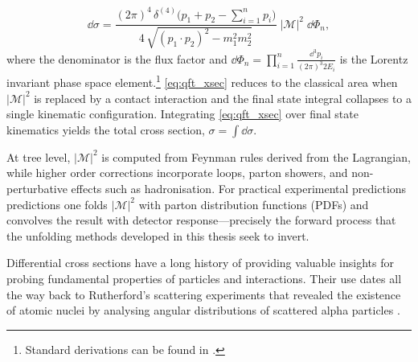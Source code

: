 \begin{definition}
    \begin{equation}
      \dd\sigma =
      \frac{(2\pi)^4 \, \delta^{(4)}\!\bigl(p_1 + p_2 - \sum_{i=1}^n p_i\bigr)}
           {4\,\sqrt{(p_1\!\cdot\!p_2)^2 - m_1^2 m_2^2}}
      \; |\mathcal{M}|^2 \;
      \dd\Phi_n,
      \label{eq:qft_xsec}
    \end{equation}
    where the denominator is the flux factor and \(\dd\Phi_n = \prod_{i=1}^{n} \tfrac{\dd^3 p_i}{(2\pi)^3 2E_i}\) is the Lorentz invariant phase space element.\footnote{Standard derivations can be found in \cite{peskin_introduction_1995,Navas2024ReviewPhysics, Hollik2014Quantum978-1-107-03473-0, QuantumAssessment}.
    }
    \cref{eq:qft_xsec} reduces to the classical area when \(|\mathcal{M}|^2\) is replaced by a contact interaction and the final state integral collapses to a single kinematic configuration.
    Integrating \cref{eq:qft_xsec} over final state kinematics yields the total cross section, \(\sigma = \int \dd\sigma\).
    
    At tree level, \(|\mathcal{M}|^2\) is computed from Feynman rules derived from the Lagrangian, while higher order corrections incorporate loops, parton showers, and non-perturbative effects such as hadronisation.
    For practical experimental predictions predictions one folds \(|\mathcal{M}|^2\) with parton distribution functions (PDFs) and convolves the result with detector response---precisely the forward process that the unfolding methods developed in this thesis seek to invert.

Differential cross sections have a long history of providing valuable insights for probing fundamental properties of particles and interactions.
%
Their use dates all the way back to Rutherford's scattering experiments that revealed the existence of atomic nuclei by analysing angular distributions of scattered alpha particles \cite{F.R.S.1911LXXIX.Atom}.


\end{definition}
